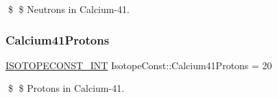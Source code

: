 \$ \$ Neutrons in Calcium-\/41. \mbox{\label{group___isotope_const-_calcium-_ca41_ga21e86b0b83a37a0050ec6ecc4320045e}} 
\subsubsection{\texorpdfstring{Calcium41\+Protons}{Calcium41Protons}}
{\footnotesize\ttfamily \mbox{\hyperlink{group___isotope_const-_macros_ga5f18360b3e99483a35c32d789e62621c}{I\+S\+O\+T\+O\+P\+E\+C\+O\+N\+S\+T\+\_\+\+I\+NT}} Isotope\+Const\+::\+Calcium41\+Protons = 20}

\$ \$ Protons in Calcium-\/41. 